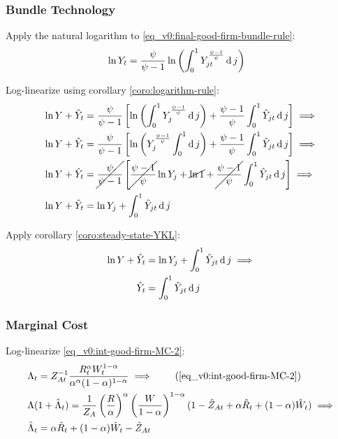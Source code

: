 \documentclass[
thesis.tex
]{subfiles}
\begin{document}
	
	\subsubsection*{Bundle Technology}
	
	Apply the natural logarithm to \ref{eq_v0:final-good-firm-bundle-rule}:
	\begin{align}
		\ln Y_t &= \frac{\psi}{\psi-1} \ln \left( \int_{0}^{1} Y_{jt}^{\frac{\psi-1}{\psi}} \operatorname{d} j \right) \nonumber
	\end{align}
	
	Log-linearize using corollary \ref{coro:logarithm-rule}:
	\begin{align}
		\ln Y + \hat{Y}_t &= \frac{\psi}{\psi-1} \left[ \ln \left( \int_{0}^{1} Y_{j}^{\frac{\psi-1}{\psi}} \operatorname{d} j \right) + \frac{\psi-1}{\psi} \int_{0}^{1} \hat{Y}_{jt} \operatorname{d} j \right] \implies \nonumber
		\\
		\ln Y + \hat{Y}_t &= \frac{\psi}{\psi-1} \left[ \ln \left( Y_{j}^{\frac{\psi-1}{\psi}} \int_{0}^{1} \operatorname{d} j \right) + \frac{\psi-1}{\psi} \int_{0}^{1} \hat{Y}_{jt} \operatorname{d} j \right] \implies \nonumber
		\\
		\ln Y + \hat{Y}_t &= \cancel{\frac{\psi}{\psi-1}} \left[ \cancel{\frac{\psi-1}{\psi}} \ln Y_{j} + \cancel{\ln1} + \cancel{\frac{\psi-1}{\psi}} \int_{0}^{1} \hat{Y}_{jt} \operatorname{d} j \right] \implies \nonumber
		\\
		\ln Y + \hat{Y}_t &= \ln Y_{j} + \int_{0}^{1} \hat{Y}_{jt} \operatorname{d} j \nonumber
	\end{align}
	
	Apply corollary \ref{coro:steady-state-YKL}:
	\begin{align}
		\ln Y + \hat{Y}_t &= \ln Y_{j} + \int_{0}^{1} \hat{Y}_{jt} \operatorname{d} j \implies \nonumber \\
		\hat{Y}_t &= \int_{0}^{1} \hat{Y}_{jt} \operatorname{d} j 
		\label{eq_v0:ll-final-good-firm-bundle-rule}
	\end{align}
	
	
	\subsubsection*{Marginal Cost}
	
	Log-linearize \ref{eq_v0:int-good-firm-MC-2}:
	\begin{alignat}{2}
		& \Lambda_t = Z_{At}^{-1} \frac{R_t^{\alpha} W_t^{1-\alpha} }{ \alpha^{\alpha} (1-\alpha)^{1-\alpha} } \implies \tag{\ref{eq_v0:int-good-firm-MC-2}} \\
		& \Lambda (1+ \hat{\Lambda}_t) = \frac{1}{Z_{A}} \left( \frac{R}{\alpha} \right)^{\alpha} \left( \frac{W}{1-\alpha} \right)^{1-\alpha} (1- \hat{Z}_{At} + \alpha \hat{R}_t + (1- \alpha) \hat{W}_t ) \implies \nonumber \\
		& \hat{\Lambda}_t = \alpha \hat{R}_t + (1- \alpha) \hat{W}_t - \hat{Z}_{At} \label{eq_v0:ll-int-good-firm-MC-2}
	\end{alignat}
	
\end{document}
